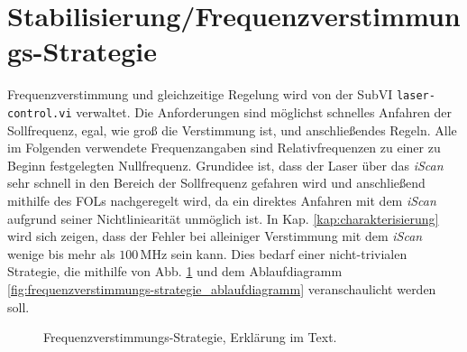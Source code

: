 \section{Stabilisierung/Frequenzverstimmungs-Strategie}\label{sec:stabilisierung_frequenzverstimmungs-strategie}
Frequenzverstimmung und gleichzeitige Regelung wird von der SubVI
\lstinline|laser-control.vi| verwaltet. Die Anforderungen sind möglichst
schnelles Anfahren der Sollfrequenz, egal, wie groß die Verstimmung ist, und
anschließendes Regeln. Alle im Folgenden verwendete Frequenzangaben sind
Relativfrequenzen zu einer zu Beginn festgelegten Nullfrequenz. Grundidee ist,
dass der Laser über das \textit{iScan} sehr schnell in den Bereich der
Sollfrequenz gefahren wird und anschließend mithilfe des FOLs nachgeregelt wird,
da ein direktes Anfahren mit dem \textit{iScan} aufgrund seiner Nichtliniearität unmöglich ist. In Kap. \ref{kap:charakterisierung} wird sich zeigen, dass der Fehler bei
alleiniger Verstimmung mit dem \textit{iScan} wenige bis mehr als $100\,$MHz sein kann.
Dies bedarf einer nicht-trivialen Strategie, die mithilfe von Abb.
\ref{fig:frequenzverstimmungs-strategie} und dem Ablaufdiagramm
\ref{fig:frequenzverstimmungs-strategie_ablaufdiagramm} veranschaulicht werden
soll.\par
\begin{figure}[h]
 	\centering
	\caption[Frequenzverstimmungs-Strategie]{Frequenzverstimmungs-Strategie,
	Erklärung im Text.}\label{fig:frequenzverstimmungs-strategie}
\end{figure}
